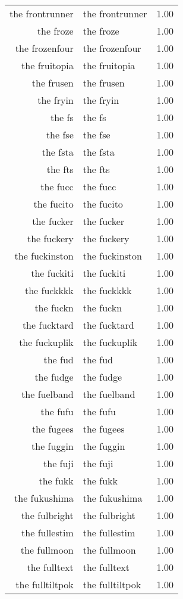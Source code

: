\begin{table}[ht]
\begin{tabular}{rlr}
  the frontrunner & the frontrunner & 1.00 \\ 
  the froze & the froze & 1.00 \\ 
  the frozenfour & the frozenfour & 1.00 \\ 
  the fruitopia & the fruitopia & 1.00 \\ 
  the frusen & the frusen & 1.00 \\ 
  the fryin & the fryin & 1.00 \\ 
  the fs & the fs & 1.00 \\ 
  the fse & the fse & 1.00 \\ 
  the fsta & the fsta & 1.00 \\ 
  the fts & the fts & 1.00 \\ 
  the fucc & the fucc & 1.00 \\ 
  the fucito & the fucito & 1.00 \\ 
  the fucker & the fucker & 1.00 \\ 
  the fuckery & the fuckery & 1.00 \\ 
  the fuckinston & the fuckinston & 1.00 \\ 
  the fuckiti & the fuckiti & 1.00 \\ 
  the fuckkkk & the fuckkkk & 1.00 \\ 
  the fuckn & the fuckn & 1.00 \\ 
  the fucktard & the fucktard & 1.00 \\ 
  the fuckuplik & the fuckuplik & 1.00 \\ 
  the fud & the fud & 1.00 \\ 
  the fudge & the fudge & 1.00 \\ 
  the fuelband & the fuelband & 1.00 \\ 
  the fufu & the fufu & 1.00 \\ 
  the fugees & the fugees & 1.00 \\ 
  the fuggin & the fuggin & 1.00 \\ 
  the fuji & the fuji & 1.00 \\ 
  the fukk & the fukk & 1.00 \\ 
  the fukushima & the fukushima & 1.00 \\ 
  the fulbright & the fulbright & 1.00 \\ 
  the fullestim & the fullestim & 1.00 \\ 
  the fullmoon & the fullmoon & 1.00 \\ 
  the fulltext & the fulltext & 1.00 \\ 
  the fulltiltpok & the fulltiltpok & 1.00 \\ 

\end{tabular}
\end{table}
